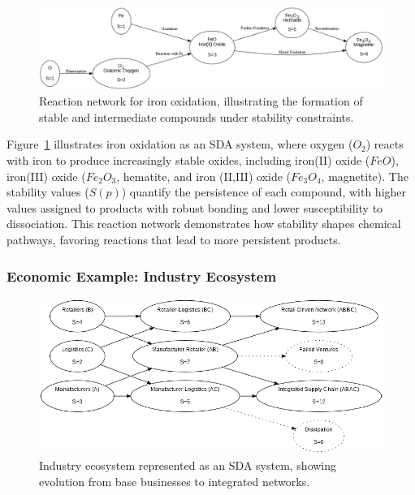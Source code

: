 \documentclass[preprint,12pt]{elsarticle}
\begin{document}
\begin{figure}[h]
    \centering
    \includegraphics[width=1\textwidth,height=0.3\textwidth]{figure_13.png}
    \caption{Reaction network for iron oxidation, illustrating the formation of stable and intermediate compounds under stability constraints.}
    \label{fig:figure_13}
\end{figure}

Figure~\ref{fig:figure_13} illustrates iron oxidation as an SDA system, where oxygen (\(O_2\)) reacts with iron to produce increasingly stable oxides, including iron(II) oxide (\(FeO\)), iron(III) oxide (\(Fe_2O_3\), hematite, and iron (II,III) oxide (\(Fe_3O_4\), magnetite). The stability values (\(S(p)\)) quantify the persistence of each compound, with higher values assigned to products with robust bonding and lower susceptibility to dissociation. This reaction network demonstrates how stability shapes chemical pathways, favoring reactions that lead to more persistent products.

\subsubsection{Economic Example: Industry Ecosystem}

\begin{figure}[h]
    \centering
    \includegraphics[width=1\textwidth]{figure_14.png}
    \caption{Industry ecosystem represented as an SDA system, showing evolution from base businesses to integrated networks.}
    \label{fig:figure_14}
\end{figure}
\end{document}

